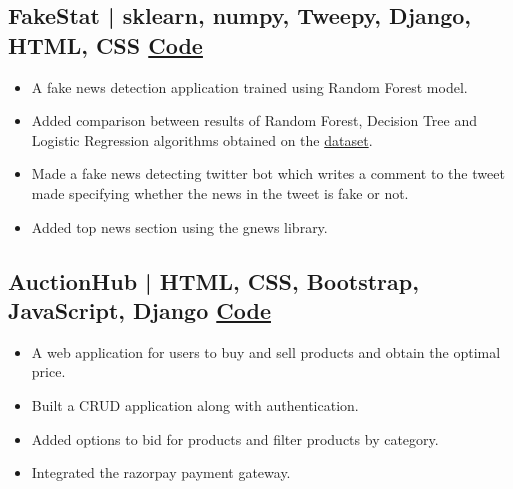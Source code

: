 \documentclass[10pt]{article}
\newenvironment{zitemize}{
\begin{itemize}\itemsep2pt \parskip0pt \parsep1pt}
{\end{itemize}\vspace{-0.5cm}}
\begin{document}
\subsection*{FakeStat | sklearn, numpy, Tweepy, Django, HTML, CSS \hfill \href{https://github.com/mihikagaonkar/FakeStat}{Code}} 
    \begin{zitemize}
        \item A fake news detection application trained using Random Forest model.
        \item Added comparison between results of Random Forest, Decision Tree and Logistic Regression algorithms obtained on the \href{https://www.kaggle.com/shubh0799/fake-news}{dataset}.
        \item Made a fake news detecting twitter bot which writes a comment to the tweet made specifying whether the news in the tweet is fake or not.
        \item Added top news section using the gnews library.
    \end{zitemize}

\subsection*{ AuctionHub | HTML, CSS, Bootstrap, JavaScript, Django \hfill \href{https://github.com/mihikagaonkar/tourit}{Code}} 
    \begin{zitemize}
        \item A  web  application  for users to buy and sell products and obtain the optimal price.
        \item Built a CRUD application along with authentication.
        \item Added options to bid for products and filter products by category.
        \item Integrated the razorpay payment gateway.
    \end{zitemize}
\end{document}
